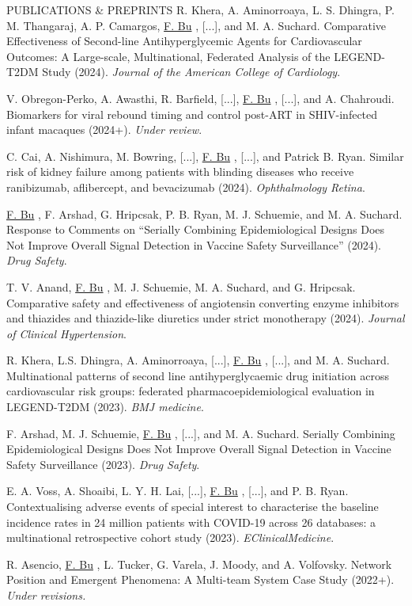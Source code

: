 \documentclass{resume} %
\newcommand{\myName}[1]{
	\underline{#1}
}
\begin{document}
\begin{rSection}{PUBLICATIONS \& PREPRINTS}
R. Khera, A. Aminorroaya, L. S. Dhingra, P. M.  Thangaraj, A. P. Camargos, \myName{F. Bu}, [...], and M. A. Suchard. Comparative Effectiveness of Second-line Antihyperglycemic Agents for Cardiovascular Outcomes: A Large-scale, Multinational, Federated Analysis of the LEGEND-T2DM Study (2024). \emph{Journal of the American College of Cardiology}. 

\smallskip 

V. Obregon-Perko, A. Awasthi, R. Barfield, [...], \myName{F. Bu}, [...], and A. Chahroudi. Biomarkers for viral rebound timing and control post-ART in SHIV-infected infant macaques (2024+). \emph{Under review}.

\smallskip 

C. Cai, A. Nishimura, M. Bowring, [...], \myName{F. Bu}, [...], and Patrick B. Ryan. Similar risk of kidney failure among patients with blinding diseases who receive ranibizumab, aflibercept, and bevacizumab (2024). \emph{Ophthalmology Retina}.

\smallskip 

\myName{F. Bu}, F. Arshad, G. Hripcsak, P. B. Ryan, M. J. Schuemie, and M. A. Suchard. Response to Comments on ``Serially Combining Epidemiological Designs Does Not Improve Overall Signal Detection in Vaccine Safety Surveillance'' (2024). \emph{Drug Safety}. 

\smallskip 

T. V. Anand,\myName{F. Bu}, M. J. Schuemie, M. A. Suchard, and G. Hripcsak. Comparative safety and effectiveness of angiotensin converting enzyme inhibitors and thiazides and thiazide-like diuretics under strict monotherapy (2024).  \emph{Journal of Clinical Hypertension}.

\smallskip 

R. Khera, L.S. Dhingra, A. Aminorroaya, [...], \myName{F. Bu}, [...], and  M. A. Suchard.  Multinational patterns of second line antihyperglycaemic drug initiation across cardiovascular risk groups: federated pharmacoepidemiological evaluation in LEGEND-T2DM (2023). \emph{BMJ medicine}. 

\smallskip

F. Arshad, M. J. Schuemie, \myName{F. Bu}, [...], and M. A. Suchard. Serially Combining Epidemiological Designs Does Not Improve Overall Signal Detection in Vaccine Safety Surveillance (2023). \emph{Drug Safety}. 

\smallskip

E. A. Voss, A. Shoaibi, L. Y. H. Lai,  [...], \myName{F. Bu}, [...], and P. B. Ryan. Contextualising adverse events of special interest to characterise the baseline incidence rates in 24 million patients with COVID-19 across 26 databases: a multinational retrospective cohort study (2023). \emph{EClinicalMedicine}. 


\smallskip

R. Asencio, \myName{F. Bu}, L. Tucker, G. Varela, J. Moody, and A. Volfovsky. 
Network Position and Emergent Phenomena: A Multi-team System Case Study (2022+). \emph{Under revisions.}




\end{rSection}
\end{document}
